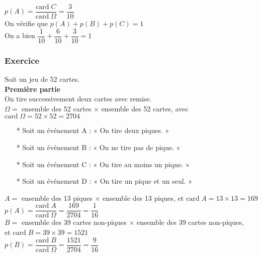 $ p\left(A\right) = \dfrac{\mathrm{card} \; C}{\mathrm{card} \; \Omega} = \dfrac{3}{10} $ \\

On vérifie que $p\left(A\right) + p\left(B\right) + p\left(C\right) = 1 $ \\

On a bien $\dfrac{1}{10} + \dfrac{6}{10} + \dfrac{3}{10} = 1 $

\newpage 

\subsubsection{Exercice }

Soit un jeu de 52 cartes. \\

\textbf{Première partie} \\

On tire successivement deux cartes avec remise. \\

$\Omega =$  ensemble des 52 cartes $ \times $ ensemble des 52 cartes, avec $\mathrm{card} \; \Omega = 52 \times 52 = 2704 $ \\

\begin{itemize}
\item[*] Soit un événement A : « On tire deux piques. » 
\item[*] Soit un événement B : « On ne tire pas de pique. » 
\item[*] Soit un événement C : « On tire au moins un pique. » 
\item[*] Soit un événement D : « On tire un pique et un seul. » 
\end{itemize}

\vspace*{.3cm }
$ A = $ ensemble des 13 piques $ \times $ ensemble des 13 piques, et $\mathrm{card} \; A = 13 \times 13 = 169 $ \\

$ p\left(A\right) = \dfrac{\mathrm{card} \; A}{\mathrm{card} \; \Omega} = \dfrac{169}{2704} = \dfrac{1}{16} $ \\

$ B = $ ensemble des 39 cartes non-piques $ \times $ ensemble des 39 cartes non-piques, \\ et $\mathrm{card} \; B = 39 \times 39 = 1521 $ \\

$ p\left(B\right) = \dfrac{\mathrm{card} \; B}{\mathrm{card} \; \Omega} = \dfrac{1521}{2704} = \dfrac{9}{16} $ \\

